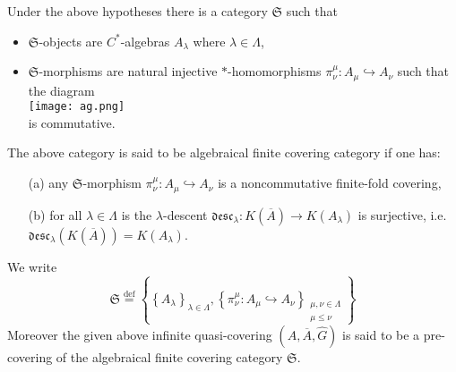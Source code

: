 \documentclass{beamer}
\theoremstyle{plain}
\newcommand{\be}{\begin{equation}}
\newcommand{\ee}{\end{equation}}
\newcommand{\desc}{\mathfrak{desc}}
\newcommand{\la}{\lambda}
\newcommand{\La}{\Lambda}
\newcommand{\bydef}{\stackrel{\mathrm{def}}{=}}
\newcommand{\hookto}{\hookrightarrow}        %
\begin{document}
\begin{frame}
	Under the above hypotheses  there is a category $\mathfrak{S}$ such that
\begin{itemize}
	\item $\mathfrak{S}$-objects are $C^*$-algebras $A_\la$ where $\la\in \La$,
	\item $\mathfrak{S}$-morphisms are natural injective $*$-homomorphisms $\pi^\mu_\nu : A_\mu \hookto A_\nu$
	such that the diagram
	\\
\texttt{[image: ag.png]}
	\\
	is commutative.
\end{itemize}

\end{frame}
\begin{frame}
 
\begin{definition}\label{algebraical_finite_covering_category_defn}
	The  above category is said to be \alert{algebraical finite covering category} if one has:
	\begin{enumerate}
		\item [(a)] 
		any $\mathfrak{S}$-morphism $\pi^\mu_\nu : A_\mu \hookto A_\nu$ is a noncommutative finite-fold  covering,
		\item[(b)] for all $\la \in \La$ is the $\la$-{descent} $\desc_{\la} : K\left(\overline A \right) \to K\left(A_\la \right)$   is surjective, i.e. $\desc_{\la} \left(  K\left(\overline A \right)\right) = K\left(A_\la \right)$.%
	\end{enumerate}
	We write
	\be\label{algebraical_finite_covering_category_eqn}
	\mathfrak{S}\bydef \left\{\left\{A_\la\right\}_{\la\in \La}, \left\{\pi^\mu_\nu : A_\mu \hookto A_\nu\right\}_{\substack{\mu, \nu \in \La\\\mu \le \nu}}\right\}
	\ee
	Moreover the given above infinite quasi-covering $\left( A, \overline A, \widehat G\right)$ is said to be a \alert{pre-covering of the algebraical finite covering category}  $\mathfrak{S}$.
\end{definition}


\end{frame}
\end{document}
